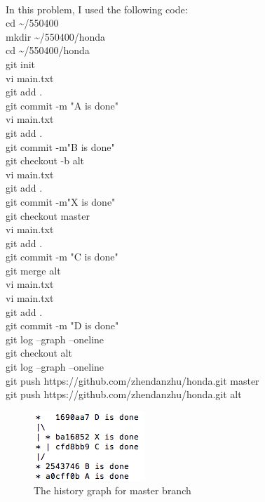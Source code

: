 \documentclass[12pt]{article}
\begin{document}
\noindent\textbf{}
\\
In this problem, I used the following code:  
  \\  cd \textasciitilde/550400
  \\  mkdir \textasciitilde/550400/honda
  \\  cd \textasciitilde/550400/honda
  \\  git init
  \\  vi main.txt
  \\  git add .
  \\  git commit -m "A is done"
  \\  vi main.txt
  \\  git add .
  \\  git commit -m"B is done"
  \\  git checkout -b alt
  \\  vi main.txt
  \\  git add .
  \\  git commit -m"X is done"
  \\  git checkout master
  \\  vi main.txt
  \\  git add .
  \\  git commit -m "C is done"
  \\  git merge alt
  \\  vi main.txt
  \\  vi main.txt
  \\  git add .
  \\  git commit -m "D is done"
  \\  git log --graph --oneline
  \\  git checkout alt
  \\  git log --graph --oneline
  \\  git push https://github.com/zhendanzhu/honda.git master
  \\  git push https://github.com/zhendanzhu/honda.git alt

\begin{figure}[h]
    \begin{center}
        \includegraphics{grapha.png}
    \end{center}
    \caption{The history graph for master branch}
    \label{fig:branch}
\end{figure}
\end{document}

